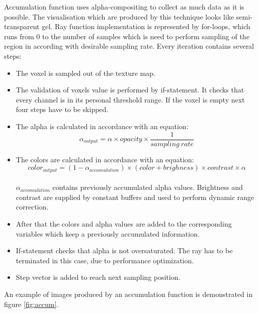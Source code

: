 \documentclass[twoside, english, 11pt]{report}
\begin{document}
Accumulation function uses alpha-compositing to collect as much data as it is possible. The visualisation which are produced by this technique looks like semi-transparent gel. Ray function implementation is represented by for-loops, which runs from 0 to the number of samples which is need to perform sampling of the region in according with desirable sampling rate. Every iteration contains several steps:
\begin{itemize}
\item The voxel is sampled out of the texture map.
\item The validation of voxels value is performed by if-statement. It checks that every channel is in its personal threshold range. If the voxel is empty next four steps have to be skipped.
\item The alpha is calculated in accordance with an equation:
\begin{equation} \label{eq:alpha}
\alpha_{output} = \alpha \times opacity \times \frac {1}{{sampling\ rate}}
\end{equation}

\item The colors are calculated in accordance with an equation:
\begin{equation} \label{eq:color}
color_{output} = (1 - \alpha_{accomulation}) \times (color + brighness) \times contrast  \times \alpha
\end{equation}\\

$\alpha_{accomulation}$ contains previously accumulated alpha values. Brightness and contrast are supplied by constant buffers and used to perform dynamic range correction.
\item After that the colors and alpha values are added to the corresponding variables which keep a previously accumulated information.
\item If-statement checks that alpha is not oversaturated. The ray has to be terminated in this case, due to performance optimization.
\item Step vector is added to reach next sampling position.
\end{itemize}

An example of images produced by an accumulation function is demonstrated in figure \ref{fig:accum}. \\
\end{document}
